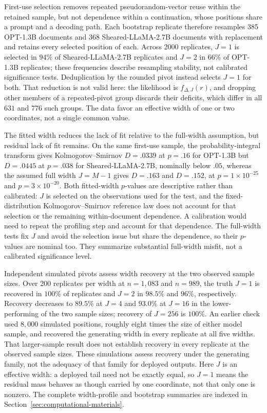 \documentclass[11pt]{article}
\begin{document}
First-use selection removes repeated pseudorandom-vector reuse within the
retained sample, but not dependence within a continuation, whose positions
share a prompt and a decoding path.  Each bootstrap replicate therefore
resamples 385 OPT-1.3B documents and 368 Sheared-LLaMA-2.7B documents with
replacement and retains every selected position of each.  Across 2000
replicates, $J=1$ is selected in $94\%$ of Sheared-LLaMA-2.7B replicates and
$J=2$ in $66\%$ of OPT-1.3B replicates; these frequencies
describe resampling stability, not calibrated significance tests.
Deduplication by the rounded pivot instead selects
$J=1$ for both.  That reduction is not valid here: the likelihood is
$f_{\Delta,J}(r)$, and dropping other members of a repeated-pivot group discards
their deficits, which differ in all $631$ and $776$ such groups.  The data favor
an effective width of one or two coordinates, not a single common value.

The fitted width reduces the lack of fit relative to the full-width assumption,
but residual lack of fit remains.  On the same first-use sample, the probability-integral
transform gives Kolmogorov--Smirnov $D=.0339$ at $p=.16$ for OPT-1.3B but
$D=.0445$ at $p=.038$ for Sheared-LLaMA-2.7B, nominally below $.05$, whereas the
assumed full width $J=M-1$ gives $D=.163$ and $D=.152$, at
$p=1\times10^{-25}$ and $p=3\times10^{-20}$.  Both fitted-width $p$-values are
descriptive rather than calibrated: $J$ is selected on the observations used
for the test, and the fixed-distribution Kolmogorov--Smirnov reference law does
not account for that selection or the remaining within-document dependence.
A calibration would need to repeat the profiling step and account for that
dependence.  The full-width tests fix $J$ and avoid the selection issue but
share the dependence, so their $p$-values are nominal too.  They summarize
substantial full-width misfit, not a calibrated significance level.

Independent simulated pivots assess width recovery at the two observed sample
sizes.  Over 200 replicates per width at $n=1{,}083$ and $n=989$, the truth
$J=1$ is recovered in $100\%$ of replicates and $J=2$ in $98.5\%$ and $96\%$,
respectively.  Recovery decreases to $89.5\%$ at $J=4$ and $93.0\%$ at $J=16$
in the lower-performing of the two sample sizes; recovery of $J=256$ is
$100\%$.  An earlier check used $8{,}000$ simulated positions, roughly eight
times the size of either model sample, and recovered the generating width in every replicate at all five widths.
That larger-sample result does not establish recovery in every replicate at the observed
sample sizes.  These simulations assess recovery under the generating family,
not the adequacy of that family for deployed outputs.  Here $J$ is an effective
width: a deployed tail need not be exactly equal, so $J=1$ means the residual
mass behaves as though carried by one coordinate, not that only one is nonzero.
The complete width-profile and bootstrap summaries are indexed in Section~\ref{sec:computational-materials}.
\end{document}
